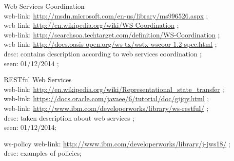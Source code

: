 {\begin{enumerate}
web-link: \url{http://www.redbooks.ibm.com/redbooks/pdfs/sg246303.pdf} ; \\ desc: short description and some basic concepts about service-orientation taken ; \\ seen: 01/12/2014 ; \\
\item [Web Services Coordination] \\ web-link: \url{http://msdn.microsoft.com/en-us/library/ms996526.aspx} ; \\
web-link: \url{http://en.wikipedia.org/wiki/WS-Coordination} ; \\
web-link: \url{http://searchsoa.techtarget.com/definition/WS-Coordination} ; \\ 
web-link: \url{http://docs.oasis-open.org/ws-tx/wstx-wscoor-1.2-spec.html} ; \\ desc: contains description according to web services coordination ; \\ seen: 01/12/2014 ; \\
\item [RESTful Web Services] \\ web-link: \url{http://en.wikipedia.org/wiki/Representational_state_transfer} ; \\
web-link: \url{https://docs.oracle.com/javaee/6/tutorial/doc/gijqy.html} ; \\ 
web-link: \url{http://www.ibm.com/developerworks/library/ws-restful/} ; \\ desc: taken description about web services ; \\ seen: 01/12/2014; \\
\item [ws-policy] web-link: 
\url{http://www.ibm.com/developerworks/library/j-jws18/} ; \\ desc: examples of policies; \
\end{enumerate}
}

